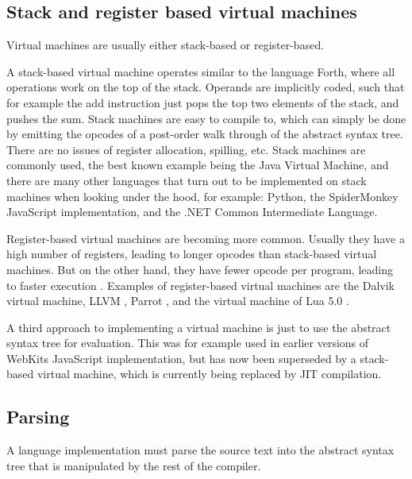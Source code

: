 \documentclass[11pt]{report}
\begin{document}

\subsection{Stack and register based virtual machines}
Virtual machines are usually either stack-based or register-based.

A stack-based virtual machine operates similar to the language Forth, where all operations work on the top of the stack. 
Operands are implicitly coded, such that for example the add instruction just pops the top two elements of the stack, and pushes the sum. 
Stack machines are easy to compile to, 
which can simply be done by emitting the opcodes of a post-order walk through of the abstract syntax tree. 
There are no issues of register allocation, spilling, etc.
Stack machines are commonly used, the best known example being the Java Virtual Machine, and there are many other languages that turn out to be implemented on stack machines when looking under the hood, for example: Python, the SpiderMonkey JavaScript implementation, and the .NET Common Intermediate Language.

Register-based virtual machines are becoming more common. 
Usually they have a high number of registers, leading to longer opcodes than stack-based virtual machines. But on the other hand, they have fewer opcode per program, leading to faster execution \cite{register-vs-stack1, register-vs-stack2}. 
Examples of register-based virtual machines are the Dalvik \cite{dalvik-vm} virtual machine, LLVM \cite{llvm}, Parrot \cite{parrot}, and the virtual machine of Lua 5.0 \cite{luavm}.

A third approach to implementing a virtual machine is just to use the abstract syntax tree for evaluation. This was for example used in earlier versions of WebKits JavaScript implementation, but has now been superseded by a stack-based virtual machine, which is currently being replaced by JIT compilation.

\subsection{Parsing}
A language implementation must parse the source text into the abstract syntax tree that is manipulated by the rest of the compiler.
\end{document}
